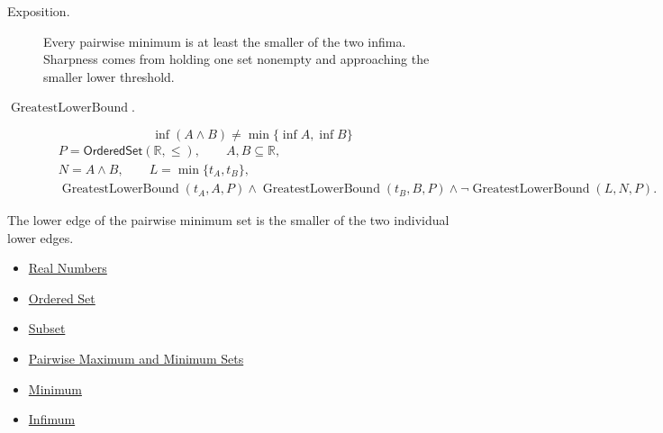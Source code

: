 \begin{remark*}
\begin{description}
\item[Exposition.]
Every pairwise minimum is at least the smaller of the two infima.  Sharpness
comes from holding one set nonempty and approaching the smaller lower threshold.


  \item[\(\operatorname{GreatestLowerBound}.\)]
  \[
\inf(A\wedge B)\neq\min\{\inf A,\inf B\}
\]
\[
\begin{aligned}
&P=\mathsf{OrderedSet}(\mathbb{R},\leq),\qquad A,B\subseteq\mathbb{R},\\
&N=A\wedge B,\qquad L=\min\{t_A,t_B\},\\
&\operatorname{GreatestLowerBound}(t_A,A,P)\land\operatorname{GreatestLowerBound}(t_B,B,P)\land
\neg\operatorname{GreatestLowerBound}(L,N,P).
\end{aligned}
\]
\end{description}
\end{remark*}

\begin{remark*}[Interpretation]
The lower edge of the pairwise minimum set is the smaller of the two individual
lower edges.
\end{remark*}

\begin{dependencies}
\begin{itemize}
  \item \hyperref[def:reals]{Real Numbers}
  \item \hyperref[def:ordered-set]{Ordered Set}
  \item \hyperref[def:subset]{Subset}
  \item \hyperref[def:pairwise-maximum-minimum-sets]{Pairwise Maximum and Minimum Sets}
  \item \hyperref[def:minimum]{Minimum}
  \item \hyperref[def:infimum]{Infimum}
\end{itemize}
\end{dependencies}
